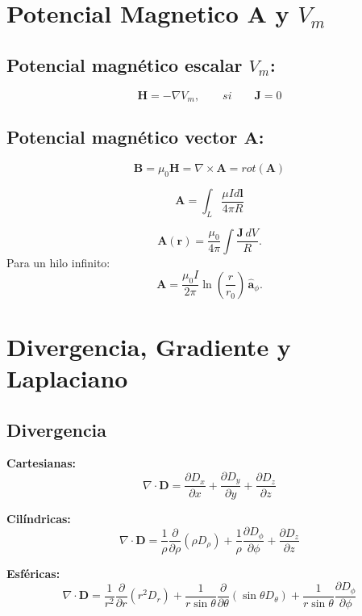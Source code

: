 \documentclass[11pt]{article}
\begin{document}
\section{Potencial Magnetico \(\mathbf{A}\) y $V_m$ }
\subsection{Potencial magnético escalar $V_{m}$:}

\[\mathbf{H}= -\nabla V_m,\qquad si \qquad\mathbf{J} = 0\]

\subsection{Potencial magnético vector \(\mathbf{A}\):}

\[
\mathbf{B} =\mu_0\mathbf{H}= \nabla \times \mathbf{A} = rot(\mathbf{A})
\]

\[
\mathbf{A}= \int_{L}\frac{\mu Id\mathbf{l}}{4\pi R}
\]

\[
\mathbf{A}(\mathbf{r})=\frac{\mu_0}{4\pi}\int
\frac{\mathbf{J}\,dV}{R}.
\]
Para un hilo infinito:
\[
\mathbf{A}= \frac{\mu_0 I}{2\pi}\ln\!\left(\frac{r}{r_0}\right)\,
\hat{\boldsymbol{a}}_{\phi}.
\]

\newpage

\section{Divergencia, Gradiente y Laplaciano}

\subsection{Divergencia}

\textbf{Cartesianas:}
\begin{equation}
    \nabla \cdot \mathbf{D} = \frac{\partial D_x}{\partial x} + \frac{\partial D_y}{\partial y} + \frac{\partial D_z}{\partial z}
\end{equation}

\textbf{Cilíndricas:}
\begin{equation}
    \nabla \cdot \mathbf{D} = \frac{1}{\rho} \frac{\partial}{\partial \rho} (\rho D_\rho) + \frac{1}{\rho} \frac{\partial D_\phi}{\partial \phi} + \frac{\partial D_z}{\partial z}
\end{equation}

\textbf{Esféricas:}
\begin{equation}
    \nabla \cdot \mathbf{D} = \frac{1}{r^2} \frac{\partial}{\partial r} (r^2 D_r) + \frac{1}{r \sin \theta} \frac{\partial}{\partial \theta} (\sin \theta D_\theta) + \frac{1}{r \sin \theta} \frac{\partial D_\phi}{\partial \phi}
\end{equation}
\end{document}
